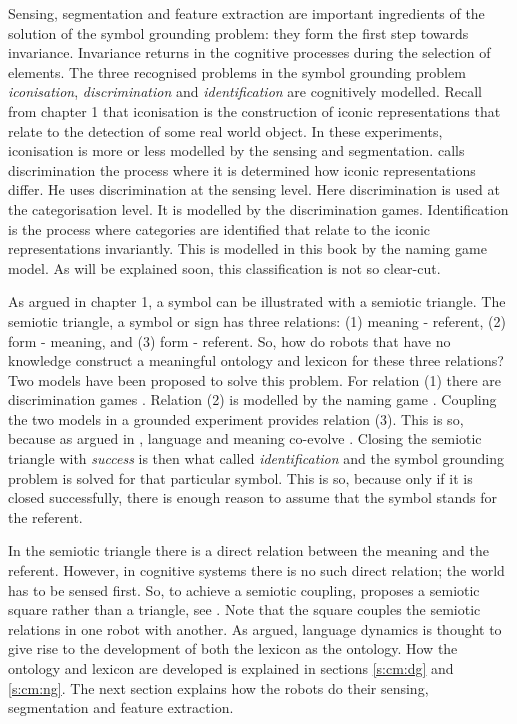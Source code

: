 Sensing, segmentation and feature extraction are important ingredients of the solution of the symbol grounding problem: they form the first step towards invariance. Invariance returns in the cognitive processes during the selection of elements. The three recognised problems in the symbol grounding problem {\em iconisation}, {\em discrimination} and {\em identification} \citep{harnad:1990} are cognitively modelled. Recall from chapter 1 that iconisation is the construction of iconic representations that relate to the detection of some real world object. In these experiments, iconisation is more or less modelled by the sensing and segmentation. \citet{harnad:1990} calls discrimination the process where it is determined how iconic representations differ. He uses discrimination at the sensing level. Here discrimination is used at the categorisation level. It is modelled by the discrimination games. Identification is the process where categories are identified that relate to the iconic representations invariantly. This is modelled in this book by the naming game model. As will be explained soon, this classification is not so clear-cut.

As argued in chapter 1, a symbol can be illustrated with a semiotic triangle. The semiotic triangle, a symbol or sign has three relations: (1) meaning - referent, (2) form - meaning, and (3) form - referent. So, how do robots that have no knowledge construct a meaningful ontology and lexicon for these three relations? Two models have been proposed to solve this problem. For relation (1) there are discrimination games \citep{steels:1996b}. Relation (2) is modelled by the naming game \citep{steels:1996a}. Coupling the two models in a grounded experiment provides relation (3). This is so, because as argued in , language and meaning co-evolve \citep{steels:1997a}. Closing the semiotic triangle with {\em success} is then what \citet{harnad:1990} called {\em identification} and the symbol grounding problem is solved for that particular symbol. This is so, because only if it is closed successfully, there is enough reason to assume that the symbol stands for the referent.

In the semiotic triangle there is a direct relation between the meaning and the referent. However, in cognitive systems there is no such direct relation; the world has to be sensed first. So, to achieve a semiotic coupling, \citet{steels:2000} proposes a semiotic square rather than a triangle, see . Note that the square couples the semiotic relations in one robot with another. As argued, language dynamics is thought to give rise to the development of both the lexicon as the ontology. How the ontology and lexicon are developed is explained in sections \ref{s:cm:dg} and \ref{s:cm:ng}. The next section explains how the robots do their sensing, segmentation and feature extraction.


